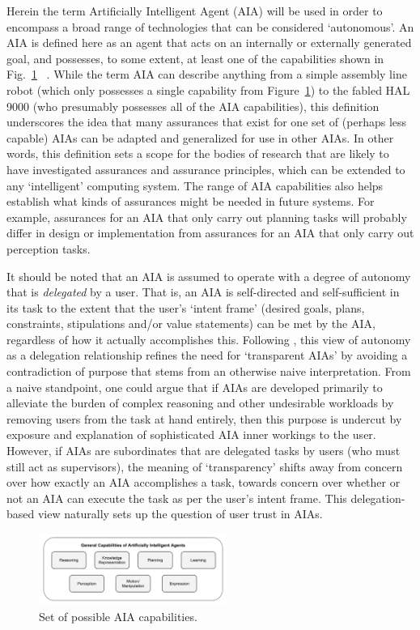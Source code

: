     Herein the term Artificially Intelligent Agent (AIA) will be used in order to encompass a broad range of technologies that can be considered `autonomous'.
    An AIA is defined here as an agent that acts on an internally or externally generated goal, and possesses, to some extent, at least one of the capabilities shown in Fig.~\ref{fig:AIcapabilities} ~\cite{Russell2010-wv,Nilsson2009-rp,Luger2008-vf}. 
    While the term AIA can describe anything from a simple assembly line robot (which only possesses a single capability from Figure~\ref{fig:AIcapabilities}) to the fabled HAL 9000 (who presumably possesses all of the AIA capabilities), this definition underscores the idea that many assurances that exist for one set of (perhaps less capable) AIAs can be adapted and generalized for use in other AIAs.
    In other words, this definition sets a scope for the bodies of research that are likely to have investigated assurances and assurance principles, which can be extended to any `intelligent' computing system. 
    The range of AIA capabilities also helps establish what kinds of assurances might be needed in future systems. 
    For example, assurances for an AIA that only carry out planning tasks will probably differ in design or implementation from assurances for an AIA that only carry out perception tasks. 
    
    It should be noted that an AIA is assumed to operate with a degree of autonomy that is \emph{delegated} by a user. That is, an AIA is self-directed and self-sufficient in its task to the extent that the user's `intent frame' (desired goals, plans, constraints, stipulations and/or value statements) can be met by the AIA, regardless of how it actually accomplishes this. %
    Following \citet{Miller2014-av}, this view of autonomy as a delegation relationship refines the need for `transparent AIAs' by avoiding a contradiction of purpose that stems from an otherwise naive interpretation. From a naive standpoint, one could argue that if AIAs are developed primarily to alleviate the burden of complex reasoning and other undesirable workloads by removing users from the task at hand entirely, then this purpose is undercut by exposure and explanation of sophisticated AIA inner workings to the user. 
    However, if AIAs are subordinates that are delegated tasks by users (who must still act as supervisors), the meaning of `transparency' shifts away from concern over how exactly an AIA accomplishes a task, towards concern over whether or not an AIA can execute the task as per the user's intent frame. 
    This delegation-based view naturally sets up the question of user trust in AIAs. 

	\begin{figure}[t!]%
    	\centering
     	\includegraphics[width=0.55\textwidth]{Figures/AI_capabilities}
    	\caption{Set of possible AIA capabilities.}
        \label{fig:AIcapabilities}
    \end{figure}
